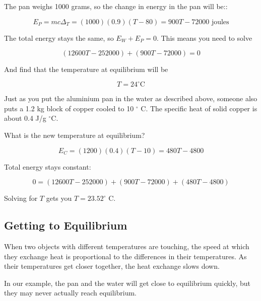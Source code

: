 The pan weighs 1000 grams, so the change in energy in the pan will be::

$$E_P = m c \Delta_T = (1000)(0.9)(T - 80) = 900T - 72000 \text{ joules}$$

The total energy stays the same, so $E_W + E_P = 0$. This means you need to solve

$$(12600T - 252000) + (900T - 72000) = 0$$

And find that the temperature at equilibrium will be

$$T = 24^\circ \text{C}$$

\begin{Exercise}[title={Thermal Equilibrium}, label=thermal_equilibrium]

Just as you put the aluminium pan in the water as described above,
someone also puts a 1.2 kg block of copper cooled to 10 $^\circ$ C.
The specific heat of solid copper is about 0.4 J/g $^\circ$C.

What is the new temperature at equilibrium?

\end{Exercise}
\begin{Answer}[ref=thermal_equilibrium]

  $$E_C = (1200)(0.4)(T - 10) = 480T - 4800$$

Total energy stays constant:

$$0 = (12600T - 252000) + (900T - 72000) + (480T - 4800)$$

Solving for $T$ gets you $T = 23.52^\circ$ C.

\end{Answer}

\subsection{Getting to Equilibrium}

When two objects with different temperatures are touching, the speed
at which they exchange heat is proportional to the differences in
their temperatures. As their temperatures get closer together,
the heat exchange slows down.

In our example, the pan and the water will get close to equilibrium
quickly, but they may never actually reach equilibrium.


